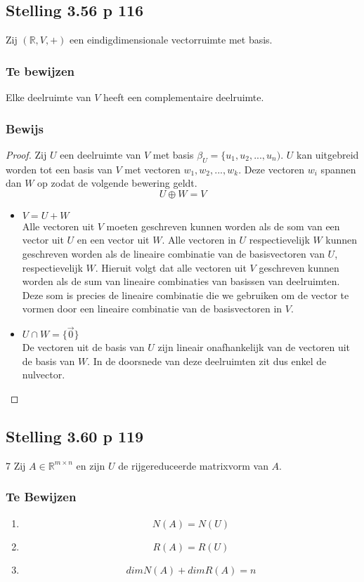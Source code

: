 \documentclass[lineaire_algebra_oplossingen.tex]{subfiles}
\begin{document}
\subsection{Stelling 3.56 p 116}
\label{3.56}
Zij $(\mathbb{R},V,+)$ een eindigdimensionale vectorruimte met basis.

\subsubsection*{Te bewijzen}
Elke deelruimte van $V$ heeft een complementaire deelruimte.

\subsubsection*{Bewijs}
\begin{proof}
Zij $U$ een deelruimte van $V$ met basis $\beta_U = \{u_1,u_2,...,u_n)$. $U$ kan uitgebreid worden tot een basis van $V$ met vectoren $w_1,w_2,...,w_k$. Deze vectoren $w_i$ spannen dan $W$ op zodat de volgende bewering geldt.
\[
U \oplus W = V
\]
\begin{itemize}
\item $V = U + W$\\
Alle vectoren uit $V$ moeten geschreven kunnen worden als de som van een vector uit $U$ en een vector uit $W$. Alle vectoren in $U$ respectievelijk $W$ kunnen geschreven worden als de lineaire combinatie van de basisvectoren van $U$, respectievelijk $W$. Hieruit volgt dat alle vectoren uit $V$ geschreven kunnen worden als de sum van lineaire combinaties van basissen van deelruimten. Deze som is precies de lineaire combinatie die we gebruiken om de vector te vormen door een lineaire combinatie van de basisvectoren in $V$.

\item $U\cap W = \{\vec{0}\}$\\
De vectoren uit de basis van $U$ zijn lineair onafhankelijk van de vectoren uit de basis van $W$. In de doorsnede van deze deelruimten zit dus enkel de nulvector.
\end{itemize}
\end{proof}


\subsection{Stelling 3.60 p 119}7
\label{3.60}
Zij $A \in \mathbb{R}^{m\times n}$ en zijn $U$ de rijgereduceerde matrixvorm van $A$.

\subsubsection*{Te Bewijzen}
\begin{enumerate}
\item 
\[
N(A) = N(U)
\]
\item
\[
R(A) = R(U)
\]
\item
\[
dimN(A) + dimR(A) = n
\]
\end{enumerate}
\end{document}
